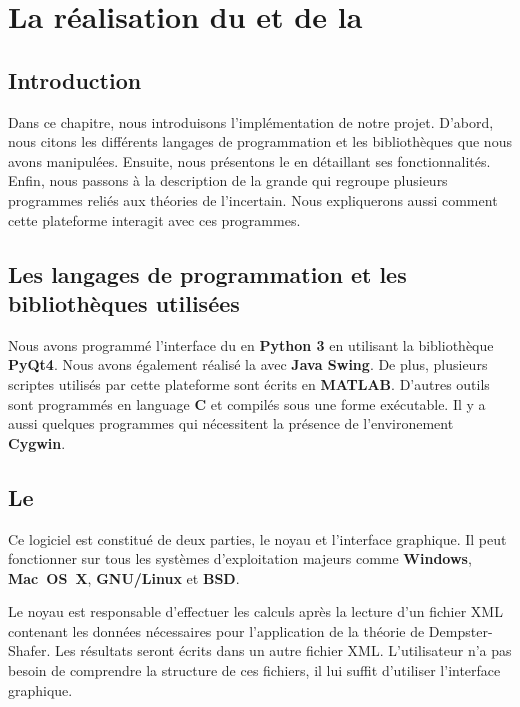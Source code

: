 \chapter{La réalisation du \appname et de la \platformename}
{}
\section*{Introduction}

Dans ce chapitre, nous introduisons l'implémentation de notre projet. D'abord, nous
citons les différents langages de programmation et les bibliothèques que nous avons manipulées.
Ensuite, nous présentons le \appname en détaillant ses fonctionnalités. Enfin, nous passons
à la description de la grande \platformename qui regroupe plusieurs programmes reliés aux théories de
l'incertain. Nous expliquerons aussi comment cette plateforme interagit avec ces programmes.

\section{Les langages de programmation et les bibliothèques utilisées}

Nous avons programmé l'interface du \appname en \textbf{Python 3}
en utilisant la bibliothèque \textbf{PyQt4}. Nous avons également réalisé la \platformename
avec \textbf{Java Swing}. De plus, plusieurs scriptes utilisés par cette
plateforme sont écrits en \textbf{MATLAB}. D'autres outils sont programmés en language
\textbf{C} et compilés sous une forme exécutable. Il y a aussi quelques programmes
qui nécessitent la présence de l'environement \textbf{Cygwin}.

\section{Le \appname}

Ce logiciel est constitué de deux parties, le noyau et l'interface graphique.
Il peut fonctionner sur tous les systèmes d'exploitation majeurs comme \textbf{Windows},
\textbf{\mbox{Mac OS X}}, \textbf{\mbox{GNU/Linux}} et \textbf{BSD}.

Le noyau est responsable d'effectuer les calculs après la lecture d'un fichier XML
contenant les données nécessaires pour l'application de la théorie de Dempster-Shafer.
Les résultats seront écrits dans un autre fichier XML. L'utilisateur n'a pas besoin
de comprendre la structure de ces fichiers, il lui suffit d'utiliser l'interface
graphique.

